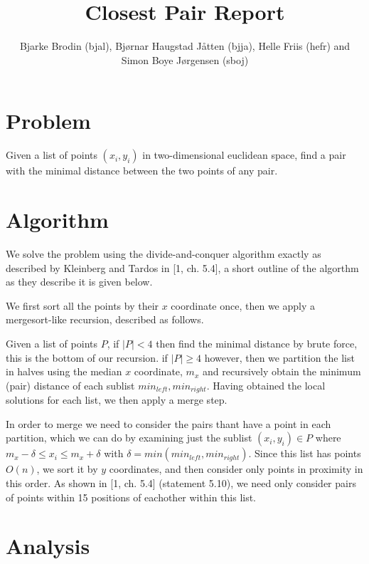 \documentclass{tufte-handout}
\title{Closest Pair Report}
\author{Bjarke Brodin (bjal), Bjørnar Haugstad Jåtten (bjja), Helle Friis (hefr) and Simon Boye Jørgensen (sboj)}
\newcommand{\kleinbergtardospp}[1]{[1, #1]}
\begin{document}
  \maketitle


  \section{Problem}

  Given a list of points $(x_i,y_i)$ in two-dimensional euclidean space,
  find a pair with the minimal distance between the two points of any pair.



  \section{Algorithm}
  
  We solve the problem using the divide-and-conquer algorithm exactly as described by Kleinberg and Tardos in \kleinbergtardospp{ch. 5.4},
  a short outline of the algorthm as they describe it is given below.

  We first sort all the points by their $x$ coordinate once, 
  then we apply a mergesort-like recursion,
  described as follows.

  Given a list of points $P$,
  if $|P| < 4$ then find the minimal distance by brute force,
  this is the bottom of our recursion.
  if $|P| \ge 4$ however,
  then we partition the list in halves using the median $x$ coordinate, $m_x$
  and recursively obtain the minimum (pair) distance of each sublist 
  $min_{left}, min_{right}$.
  Having obtained the local solutions for each list,
  we then apply a merge step.
  
  In order to merge we need to consider the 
  pairs thant have a point in each partition,
  which we can do by examining just the sublist 
  $(x_i, y_i) \in P$ where $m_x - \delta \le x_i \le m_x + \delta$
  with $\delta = min(min_{left}, min_{right})$.
  Since this list has points $O(n)$,
  we sort it by $y$ coordinates,
  and then consider only points in proximity in this order.
  As shown in \kleinbergtardospp{ch. 5.4} (statement 5.10),
  we need only consider pairs of points within 15 positions of
  eachother within this list.



  \section{Analysis}
\end{document}
